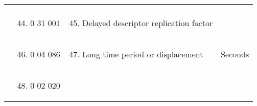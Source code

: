 \begin{longtable}[]{@{}llll@{}}
\begin{minipage}[t]{0.22\columnwidth}
\strut
\end{minipage}\tabularnewline
\begin{minipage}[t]{0.22\columnwidth}\raggedright
\strut
\end{minipage} & \begin{minipage}[t]{0.22\columnwidth}\raggedright
\begin{enumerate}
\setcounter{enumi}{43}
\item
  0 31 001
\end{enumerate}\strut
\end{minipage} & \begin{minipage}[t]{0.22\columnwidth}\raggedright
\begin{enumerate}
\setcounter{enumi}{44}
\item
  Delayed descriptor replication factor
\end{enumerate}\strut
\end{minipage} & \begin{minipage}[t]{0.22\columnwidth}\raggedright
\strut
\end{minipage}\tabularnewline
\begin{minipage}[t]{0.22\columnwidth}\raggedright
\strut
\end{minipage} & \begin{minipage}[t]{0.22\columnwidth}\raggedright
\begin{enumerate}
\setcounter{enumi}{45}
\item
  0 04 086
\end{enumerate}\strut
\end{minipage} & \begin{minipage}[t]{0.22\columnwidth}\raggedright
\begin{enumerate}
\setcounter{enumi}{46}
\item
  Long time period or displacement
\end{enumerate}\strut
\end{minipage} & \begin{minipage}[t]{0.22\columnwidth}\raggedright
Seconds\strut
\end{minipage}\tabularnewline
\begin{minipage}[t]{0.22\columnwidth}\raggedright
\strut
\end{minipage} & \begin{minipage}[t]{0.22\columnwidth}\raggedright
\begin{enumerate}
\setcounter{enumi}{47}
\item
  0 02 020
\end{enumerate}\strut

\end{minipage}
\end{longtable}
